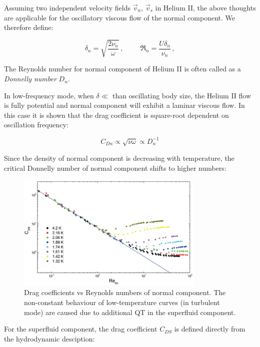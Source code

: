 Assuming two independent velocity fields $\vec{v}_n$, $\vec{v}_s$ in Helium II, the above thoughts are applicable for the oscillatory viscous flow of the normal component. We therefore define:

\begin{equation}
\delta_n = \sqrt{\frac{2\nu_n}{\omega}}\,,
\hspace{1cm}
\Re_n = \frac{U \delta_n}{\nu_n}
\label{twofluid}\,,
\end{equation}

The Reynolds number for normal component of Helium II is often called as a \textit{Donnelly number} $D_n$.

In low-frequency mode, when $\delta \ll$ than oscillating body size, the Helium II flow is fully potential and normal component will exhibit a laminar viscous flow. In this case it is shown that the drag coefficient is square-root dependent on oscillation frequency:

\begin{equation}
C_{Dn} \propto \sqrt{\nu \omega} \propto D_n^{-1}
\end{equation}

Since the density of normal component is decreasing with temperature, the critical Donnelly number of normal component shifts to higher numbers:

\begin{figure}[h]
	\centering
	\includegraphics[width=0.8\textwidth]{graphics/theory/C-Re_normal}
	\caption{Drag coefficients vs Reynolds numbers of normal component. The non-constant behaviour of low-temperature curves (in turbulent mode) are caused due to additional QT in the superfluid component.}
	\label{C-Re_normal}
\end{figure}

For the superfluid component, the drag coefficient $C_{DS}$ is defined directly from the hydrodynamic desciption:

